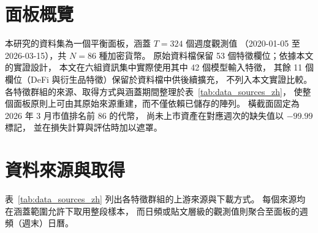 
\section{面板概覽}

本研究的資料集為一個平衡面板，涵蓋 $T = 324$ 個週度觀測值
（2020-01-05 至 2026-03-15），共 $N = 86$ 種加密貨幣。
原始資料檔保留 53 個特徵欄位；依據本文的實證設計，
本文在六組資訊集中實際使用其中 42 個模型輸入特徵，
其餘 11 個欄位（DeFi 與衍生品特徵）保留於資料檔中供後續擴充，
不列入本文實證比較。
各特徵群組的來源、取得方式與涵蓋期間整理於表~\ref{tab:data_sources_zh}，
使整個面板原則上可由其原始來源重建，而不僅依賴已儲存的陣列。
橫截面固定為 2026 年 3 月市值排名前 86 的代幣，
尚未上市資產在對應週次的缺失值以 $-99.99$ 標記，
並在損失計算與評估時加以遮罩。

\section{資料來源與取得}
\label{sec:data:sources}

表~\ref{tab:data_sources_zh} 列出各特徵群組的上游來源與下載方式。
每個來源均在涵蓋範圍允許下取用整段樣本，
而日頻或貼文層級的觀測值則聚合至面板的週頻（週末）日曆。

